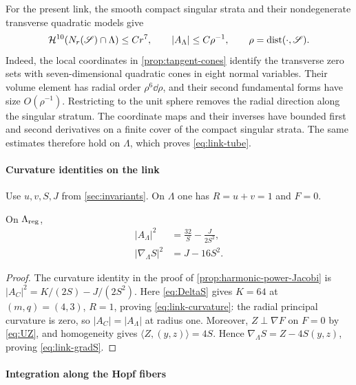 For the present link, the smooth compact singular strata and their
nondegenerate transverse quadratic models give
\begin{equation}\label{eq:link-tube}
 \mathcal H^{10}(N_r(\mathscr S)\cap\Lambda)\leq Cr^7,
 \qquad |A_\Lambda|\leq C\rho^{-1},\qquad
 \rho=\operatorname{dist}(\cdot,\mathscr S).
\end{equation}
Indeed, the local coordinates in \cref{prop:tangent-cones} identify
the transverse zero sets with seven-dimensional quadratic cones in
eight normal variables.  Their volume element has radial order
\(\rho^6\dd\rho\), and their second fundamental forms have size
\(O(\rho^{-1})\).  Restricting to the unit sphere removes the radial
direction along the singular stratum.  The coordinate maps and their
inverses have bounded first and second derivatives on a finite cover
of the compact singular strata.  The same estimates therefore hold on
\(\Lambda\), which proves \eqref{eq:link-tube}.

\paragraph*{Curvature identities on the link}

Use $u,v,S,J$ from \cref{sec:invariants}. On
$\Lambda$ one has $R=u+v=1$ and $F=0$.

\begin{lemma}
\label{lem:link-curvature}
On $\Lambda_{\mathrm{reg}}$,
\begin{align}
 |A_\Lambda|^2&=\frac{32}{S}-\frac{J}{2S^2},
 \label{eq:link-curvature}\\
 |\nabla_\Lambda S|^2&=J-16S^2.
 \label{eq:link-gradS}
\end{align}
\end{lemma}

\begin{proof}
The curvature identity in the proof of
\cref{prop:harmonic-power-Jacobi} is
\(|A_C|^2=K/(2S)-J/(2S^2)\). Here \eqref{eq:DeltaS} gives
\(K=64\) at \((m,q)=(4,3)\), \(R=1\), proving
\eqref{eq:link-curvature}: the radial principal curvature is zero,
so \(|A_C|=|A_\Lambda|\) at radius one.
Moreover, \(Z\perp\nabla F\) on \(F=0\) by \eqref{eq:UZ}, and homogeneity gives
\(\langle Z,(y,z)\rangle=4S\).  Hence
\(\nabla_\Lambda S=Z-4S(y,z)\), proving
\eqref{eq:link-gradS}.
\end{proof}

\paragraph*{Integration along the Hopf fibers}

